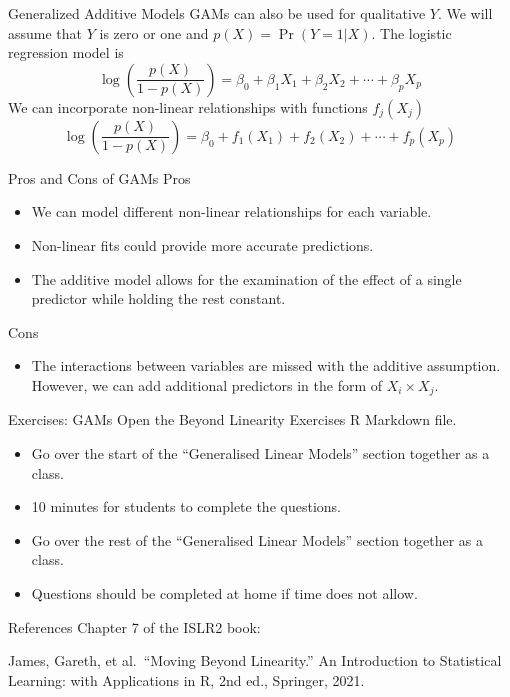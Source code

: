 \documentclass[
  ignorenonframetext,
  aspectratio=169,
]{beamer}
\providecommand{\tightlist}{%
  \setlength{\itemsep}{0pt}\setlength{\parskip}{0pt}}\usepackage{longtable,booktabs,array}
\begin{document}
\begin{frame}{Generalized Additive Models}
\protect\hypertarget{generalized-additive-models-1}{}
GAMs can also be used for qualitative \(Y\). We will assume that \(Y\)
is zero or one and \(p(X) = \operatorname{Pr}(Y = 1|X)\). The logistic
regression model is \[
\log \left(\frac{p(X)}{1-p(X)}\right)=\beta_{0}+\beta_{1} X_{1}+\beta_{2} X_{2}+\cdots+\beta_{p} X_{p}
\] We can incorporate non-linear relationships with functions
\(f_j(X_j)\) \[
\log \left(\frac{p(X)}{1-p(X)}\right)=\beta_{0}+f_{1}\left(X_{1}\right)+f_{2}\left(X_{2}\right)+\cdots+f_{p}\left(X_{p}\right)
\]
\end{frame}

\begin{frame}{Pros and Cons of GAMs}
\protect\hypertarget{pros-and-cons-of-gams}{}
Pros

\begin{itemize}
\item
  We can model different non-linear relationships for each variable.
\item
  Non-linear fits could provide more accurate predictions.
\item
  The additive model allows for the examination of the effect of a
  single predictor while holding the rest constant.
\end{itemize}

Cons

\begin{itemize}
\tightlist
\item
  The interactions between variables are missed with the additive
  assumption. However, we can add additional predictors in the form of
  \(X_i \times X_j\).
\end{itemize}
\end{frame}

\begin{frame}{Exercises: GAMs}
\protect\hypertarget{exercises-gams}{}
Open the Beyond Linearity Exercises R Markdown file.

\begin{itemize}
\item
  Go over the start of the ``Generalised Linear Models'' section
  together as a class.
\item
  10 minutes for students to complete the questions.
\item
  Go over the rest of the ``Generalised Linear Models'' section together
  as a class.
\item
  Questions should be completed at home if time does not allow.
\end{itemize}
\end{frame}

\begin{frame}{References}
\protect\hypertarget{references}{}
Chapter 7 of the ISLR2 book:

James, Gareth, et al.~``Moving Beyond Linearity.'' An Introduction to
Statistical Learning: with Applications in R, 2nd ed., Springer, 2021.
\end{frame}
\end{document}
